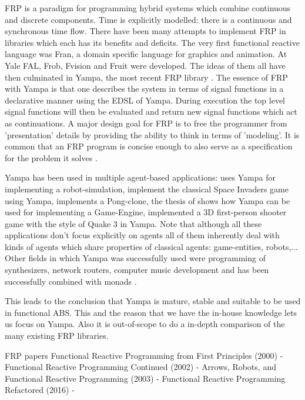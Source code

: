 FRP is a paradigm for programming hybrid systems which combine continuous and discrete components. Time is explicitly modelled: there is a continuous and synchronous time flow. There have been many attempts to implement FRP in libraries which each has its benefits and deficits. The very first functional reactive language was Fran, a domain specific language for graphics and animation. At Yale FAL, Frob, Fvision and Fruit were developed. The ideas of them all have then culminated in Yampa, the most recent FRP library \cite{nilsson_functional_2002}. The essence of FRP with Yampa is that one describes the system in terms of signal functions in a declarative manner using the EDSL of Yampa. During execution the top level signal functions will then be evaluated and return new signal functions which act as continuations. A major design goal for FRP is to free the programmer from 'presentation' details by providing the ability to think in terms of 'modeling'. It is common that an FRP program is concise enough to also serve as a specification for the problem it solves \cite{wan_functional_2000}.

Yampa has been used in multiple agent-based applications: \cite{hudak_arrows_2003} uses Yampa for implementing a robot-simulation, \cite{courtney_yampa_2003} implement the classical Space Invaders game using Yampa, \cite{nilsson_declarative_2014} implements a Pong-clone, the thesis of \cite{meisinger_game-engine-architektur_2010} shows how Yampa can be used for implementing a Game-Engine, \cite{mun_hon_functional_2005} implemented a 3D first-person shooter game with the style of Quake 3 in Yampa. Note that although all these applications don't focus explicitly on agents all of them inherently deal with kinds of agents which share properties of classical agents: game-entities, robots,... Other fields in which Yampa was successfully used were programming of synthesizers, network routers, computer music development and has been successfully combined with monads \cite{perez_functional_2016}.

This leads to the conclusion that Yampa is mature, stable and suitable to be used in functional ABS. This and the reason that we have the in-house knowledge lets us focus on Yampa. Also it is out-of-scope to do a in-depth comparison of the many existing FRP libraries.

FRP papers
Functional Reactive Programming from First Principles (2000) - \cite{wan_functional_2000}
Functional Reactive Programming Continued (2002) - \cite{nilsson_functional_2002}
Arrows, Robots, and Functional Reactive Programming (2003) - \cite{hudak_arrows_2003}
Functional Reactive Programming Refactored (2016) - \cite{perez_functional_2016}

